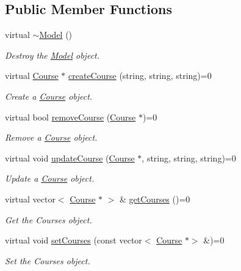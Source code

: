 \subsection*{Public Member Functions}
\begin{DoxyCompactItemize}
\item 
virtual \hyperlink{classModel_af032d8433c87a0a3a431faf6563a1f03}{$\sim$\+Model} ()
\begin{DoxyCompactList}\small\item\em Destroy the \hyperlink{classModel}{Model} object. \end{DoxyCompactList}\item 
virtual \hyperlink{classCourse}{Course} $\ast$ \hyperlink{classModel_ab62d035cd5240332e249d39ff9f98f9a}{create\+Course} (string, string, string)=0
\begin{DoxyCompactList}\small\item\em Create a \hyperlink{classCourse}{Course} object. \end{DoxyCompactList}\item 
virtual bool \hyperlink{classModel_acc20a58c9a9c7506b06df890e287433e}{remove\+Course} (\hyperlink{classCourse}{Course} $\ast$)=0
\begin{DoxyCompactList}\small\item\em Remove a \hyperlink{classCourse}{Course} object. \end{DoxyCompactList}\item 
virtual void \hyperlink{classModel_aa3ea9c92f586cec1944e3dcdee8c0672}{update\+Course} (\hyperlink{classCourse}{Course} $\ast$, string, string, string)=0
\begin{DoxyCompactList}\small\item\em Update a \hyperlink{classCourse}{Course} object. \end{DoxyCompactList}\item 
virtual vector$<$ \hyperlink{classCourse}{Course} $\ast$ $>$ \& \hyperlink{classModel_aded51911782e4fa19a79a423482dc561}{get\+Courses} ()=0
\begin{DoxyCompactList}\small\item\em Get the Courses object. \end{DoxyCompactList}\item 
virtual void \hyperlink{classModel_a9a4cc2b97cd97bc987f019dca7aa5d9e}{set\+Courses} (const vector$<$ \hyperlink{classCourse}{Course} $\ast$$>$ \&)=0
\begin{DoxyCompactList}\small\item\em Set the Courses object. \end{DoxyCompactList}\item 
$$
\end{DoxyCompactItemize}
